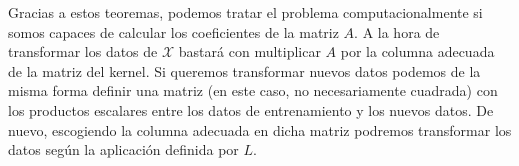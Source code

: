 Gracias a estos teoremas, podemos tratar el problema computacionalmente si somos capaces de calcular los coeficientes de la matriz $A$. A la hora de transformar los datos de $\mathcal{X}$ bastará con multiplicar $A$ por la columna adecuada de la matriz del kernel. Si queremos transformar nuevos datos podemos de la misma forma definir una matriz (en este caso, no necesariamente cuadrada) con los productos escalares entre los datos de entrenamiento y los nuevos datos. De nuevo, escogiendo la columna adecuada en dicha matriz podremos transformar los datos según la aplicación definida por $L$.


